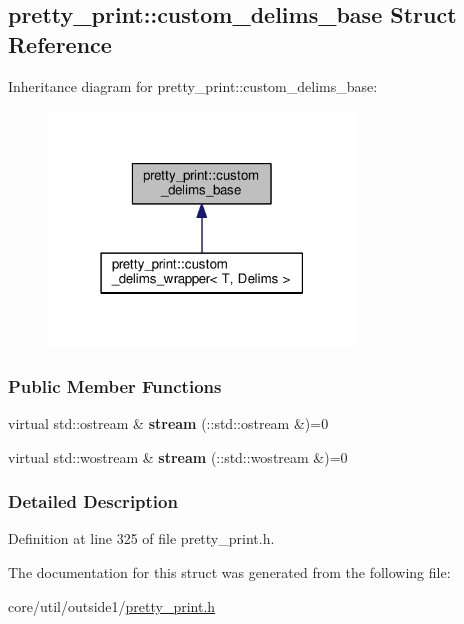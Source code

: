 \hypertarget{structpretty__print_1_1custom__delims__base}{}\subsection{pretty\+\_\+print\+:\+:custom\+\_\+delims\+\_\+base Struct Reference}
\label{structpretty__print_1_1custom__delims__base}


Inheritance diagram for pretty\+\_\+print\+:\+:custom\+\_\+delims\+\_\+base\+:
\nopagebreak
\begin{figure}[H]
\begin{center}
\leavevmode
\includegraphics[width=231pt]{structpretty__print_1_1custom__delims__base__inherit__graph}
\end{center}
\end{figure}
\subsubsection*{Public Member Functions}
\begin{DoxyCompactItemize}
\item 
virtual std\+::ostream \& {\bfseries stream} (\+::std\+::ostream \&)=0\hypertarget{structpretty__print_1_1custom__delims__base_af1cdfd5a95544e03ab668aea96c694a5}{}\label{structpretty__print_1_1custom__delims__base_af1cdfd5a95544e03ab668aea96c694a5}

\item 
virtual std\+::wostream \& {\bfseries stream} (\+::std\+::wostream \&)=0\hypertarget{structpretty__print_1_1custom__delims__base_a4b92573a491f6475ad861d17e8408f5b}{}\label{structpretty__print_1_1custom__delims__base_a4b92573a491f6475ad861d17e8408f5b}

\end{DoxyCompactItemize}


\subsubsection{Detailed Description}


Definition at line 325 of file pretty\+\_\+print.\+h.



The documentation for this struct was generated from the following file\+:\begin{DoxyCompactItemize}
\item 
core/util/outside1/\hyperlink{pretty__print_8h}{pretty\+\_\+print.\+h}\end{DoxyCompactItemize}
